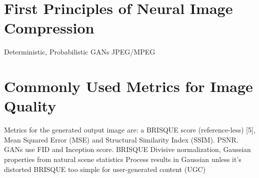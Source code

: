 \section{First Principles of Neural Image Compression}

Deterministic, Probabilistic
GANs
JPEG/MPEG

\section{Commonly Used Metrics for Image Quality}
Metrics for the generated output image are: a BRISQUE score (reference-less) [5], 
Mean Squared Error (MSE) and Structural Similarity Index (SSIM). PSNR.
GANs use FID and Inception score. 
BRISQUE \citep{BRISQUE}
Divisive normalization, Gaussian properties from natural scene statistics
Process results in Gaussian unless it's distorted
BRISQUE too simple for user-generated content (UGC)